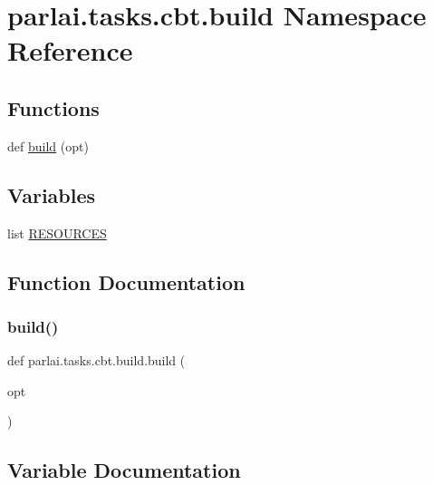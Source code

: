 \hypertarget{namespaceparlai_1_1tasks_1_1cbt_1_1build}{}\section{parlai.\+tasks.\+cbt.\+build Namespace Reference}
\label{namespaceparlai_1_1tasks_1_1cbt_1_1build}
\subsection*{Functions}
\begin{DoxyCompactItemize}
\item 
def \hyperlink{namespaceparlai_1_1tasks_1_1cbt_1_1build_a761a40fc1977992c31cb21a230ba12c5}{build} (opt)
\end{DoxyCompactItemize}
\subsection*{Variables}
\begin{DoxyCompactItemize}
\item 
list \hyperlink{namespaceparlai_1_1tasks_1_1cbt_1_1build_ae08deedf182e874d8653cda0704bff83}{R\+E\+S\+O\+U\+R\+C\+ES}
\end{DoxyCompactItemize}


\subsection{Function Documentation}
\mbox{\label{namespaceparlai_1_1tasks_1_1cbt_1_1build_a761a40fc1977992c31cb21a230ba12c5}} 
\subsubsection{\texorpdfstring{build()}{build()}}
{\footnotesize\ttfamily def parlai.\+tasks.\+cbt.\+build.\+build (\begin{DoxyParamCaption}\item[{}]{opt }\end{DoxyParamCaption})}



\subsection{Variable Documentation}
\mbox{\label{namespaceparlai_1_1tasks_1_1cbt_1_1build_ae08deedf182e874d8653cda0704bff83}} 
